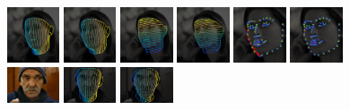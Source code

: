 \begin{figure}[h]
\includegraphics[width=0.13775\textwidth]{resources/Human_Poses/results/3/HGT}
\includegraphics[width=0.13775\textwidth]{resources/Human_Poses/results/3/Hreg}
\includegraphics[width=0.13775\textwidth]{resources/Human_Poses/results/3/VGT}
\includegraphics[width=0.13775\textwidth]{resources/Human_Poses/results/3/Vreg}
\includegraphics[width=0.13775\textwidth]{resources/Human_Poses/results/3/Landmarks_alp}
\includegraphics[width=0.13775\textwidth]{resources/Human_Poses/results/3/Landmarks_MDM}\\
%
\includegraphics[width=0.13775\textwidth]{resources/Human_Poses/results/7/I}
\includegraphics[width=0.13775\textwidth]{resources/Human_Poses/results/7/HGT}
\includegraphics[width=0.13775\textwidth]{resources/Human_Poses/results/7/Hreg}

\end{figure}

